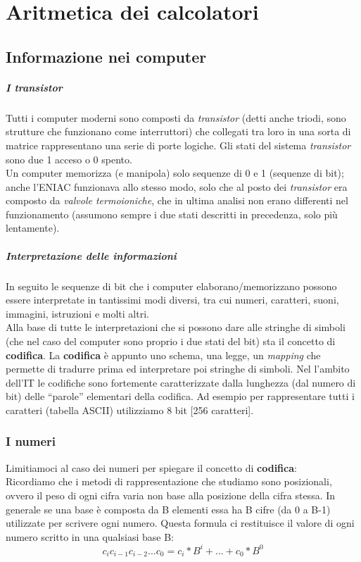 \chapter{Aritmetica dei calcolatori}

\section{Informazione nei computer}
\paragraph*{I transistor} Tutti i computer moderni sono composti da \textit{transistor} (detti anche triodi, sono strutture che funzionano come interruttori) che collegati tra loro in una sorta di matrice rappresentano una serie di porte logiche. Gli stati del sistema \textit{transistor} sono due 1 acceso o 0 spento.\\ Un computer memorizza (e manipola) solo sequenze di 0 e 1 (sequenze di bit); anche l’ENIAC funzionava allo stesso modo, solo che al posto dei \textit{transistor} era composto da \textit{valvole termoioniche}, che in ultima analisi non erano differenti nel funzionamento (assumono sempre i due stati descritti in precedenza, solo più lentamente).
\paragraph*{Interpretazione delle informazioni} In seguito le sequenze di bit che i computer elaborano/memorizzano possono essere interpretate in tantissimi modi diversi, tra cui numeri, caratteri, suoni, immagini, istruzioni e molti altri.\\
Alla base di tutte le interpretazioni che si possono dare alle stringhe di simboli (che nel caso del computer sono proprio i due stati del bit) sta il concetto di \textbf{codifica}. La \textbf{codifica} è appunto uno schema, una legge, un \textit{mapping} che permette di tradurre prima ed interpretare poi stringhe di simboli.
Nel l’ambito dell’IT le codifiche sono fortemente caratterizzate dalla lunghezza (dal numero di bit) delle “parole” elementari della codifica. Ad esempio per rappresentare tutti i caratteri (tabella ASCII) utilizziamo  8 bit [256 caratteri].
\subsection{I numeri}
Limitiamoci al caso dei numeri per spiegare il concetto di \textbf{codifica}:\\
Ricordiamo che i  metodi di rappresentazione che studiamo sono posizionali, ovvero il peso di ogni cifra varia non base alla posizione della cifra stessa.
In generale se una base è composta da B elementi essa ha B cifre (da 0 a B-1) utilizzate per scrivere ogni numero.
Questa formula ci restituisce il valore di ogni numero scritto in una qualsiasi base B:\\
\[c_{i} c_{i-1} c_{i-2}... c_{0}=c_{i}*B^{i}+...+c_{0}*B^{0}\]\\
